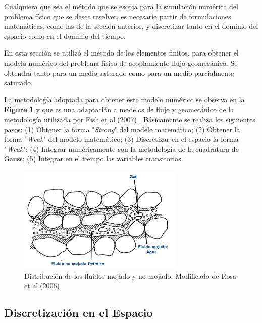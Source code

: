 Cualquiera que sea el método que se escoja para la simulación numérica del problema físico que se desee resolver, es necesario partir de formulaciones matemáticas, como las de la sección anterior, y discretizar tanto en el dominio del espacio como en el dominio del tiempo.\bigskip

En esta sección se utilizó el método de los elementos finitos, para obtener el modelo numérico del problema físico de acoplamiento flujo-geomecánico. Se obtendrá tanto para un medio saturado como para un medio parcialmente saturado.\bigskip

La metodología adoptada para obtener este modelo numérico se observa en la \textbf{Figura} \textbf{\ref{fig:fig35}} y que es una adaptación a modelos de flujo y geomecánico de la metodología utilizada por Fish et al.(2007) \cite{Fish2007AElements}. Básicamente se realiza los siguientes pasos: (1) Obtener la forma "\textit{Strong}" del modelo matemático; (2) Obtener la forma "\textit{Weak}" del modelo matemático; (3) Discretizar en el espacio la forma "\textit{Weak}"; (4) Integrar numéricamente con la metodología de la cuadratura de Gauss; (5) Integrar en el tiempo las variables transitorias.\bigskip


\begin{figure}[!ht]
\centering
\includegraphics[width=8cm]{Imagenes/Mojabilidad.png}
\caption[Distribución de los fluidos mojado y no-mojado]{Distribución de los fluidos mojado y no-mojado. Modificado de Rosa et al.(2006) \cite{Rosa2006EngenhariaPetroleo}}
\label{fig:fig35}
\end{figure}
\newpage

\subsection{Discretización en el Espacio}~\hypertarget{sec:sec341}{}
\label{sec:sec341}

